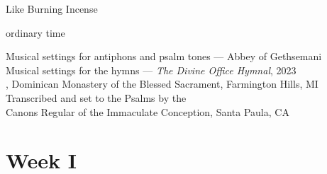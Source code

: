 \documentclass[12pt,largepostvopaper]{memoir}
\begin{document}
\pagestyle{empty}
\onecolumn

\null\vfill
\begin{center}
  \LARGE
  Like Burning Incense

  \bigskip\Large ordinary time

  \vfill\vfill\null

\end{center}


\newpage

\null\vfill
\begin{center}
  \vfill\footnotesize
  Musical settings for antiphons and psalm tones --- Abbey of Gethsemani\\
  Musical settings for the hymns --- \emph{The Divine Office Hymnal}, 2023\\
  , Dominican Monastery of the Blessed Sacrament, Farmington Hills, MI\\
  Transcribed and set to the Psalms by the\\
  Canons Regular of the Immaculate Conception, Santa Paula, CA
\end{center}

\newpage



\tableofcontents*

\chapter{Week I}

\pagestyle{fancy}






\end{document}
